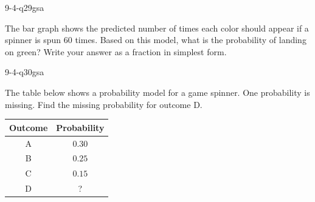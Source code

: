 \begin{practiceQuestion}{9-4-q29}{gsa}
\begin{questionText}
The bar graph shows the predicted number of times each color should appear if a spinner is spun $60$ times. Based on this model, what is the probability of landing on green? Write your answer as a fraction in simplest form.

\begin{center}
\end{center}
\end{questionText}
\end{practiceQuestion}

\begin{practiceQuestion}{9-4-q30}{gsa}
\begin{questionText}
The table below shows a probability model for a game spinner. One probability is missing. Find the missing probability for outcome D.

\begin{center}
\begin{tabular}{|c|c|}
\hline
\textbf{Outcome} & \textbf{Probability} \\
\hline
A & $0.30$ \\
\hline
B & $0.25$ \\
\hline
C & $0.15$ \\
\hline
D & ? \\
\hline
\end{tabular}
\end{center}
\end{questionText}
\end{practiceQuestion}
